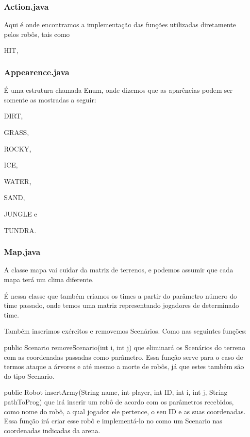 \documentclass[a4paper]{article}
\begin{document}
		\subsubsection{ Action.java }
		    Aqui é onde encontramos a implementação das funções
		    utilizadas diretamente pelos robôs, tais como 
		    {\textcolor{NavyBlue}{HIT},
		    {\textcolor{NavyBlue}{}
		    
		\subsubsection{ Appearence.java }
		    É uma estrutura chamada Enum, onde dizemos que as
		    aparências podem ser somente as mostradas a seguir:
		    {\textcolor{NavyBlue}{DIRT},
            {\textcolor{NavyBlue}{GRASS},
            {\textcolor{NavyBlue}{ROCKY},
            {\textcolor{NavyBlue}{ICE},
            {\textcolor{NavyBlue}{WATER},
            {\textcolor{NavyBlue}{SAND},
            {\textcolor{NavyBlue}{JUNGLE} e
            {\textcolor{NavyBlue}{TUNDRA}.
		
		\subsubsection{ Map.java }
		    A classe mapa vai cuidar da matriz de terrenos, e 
		    podemos assumir que cada mapa terá um clima diferente.
		    
		    É nessa classe que também criamos os times a partir
		    do parâmetro número do time passado, onde temos uma 
		    matriz representando jogadores de determinado time.
		    
		    Também inserimos exércitos e removemos Scenários.
		    Como nas seguintes funções:
		    
		    {\textcolor{NavyBlue}{public Scenario
		    removeScenario(int i, int j)}
		    que eliminará os Scenários do terreno com as coordenadas
		    passadas como parâmetro. Essa função serve para o caso 
		    de termos ataque a árvores e até mesmo a morte de robôs,
		    já que estes também são do tipo Scenario.
		    
		    {\textcolor{NavyBlue}{public Robot insertArmy(String
		    name, int player, int ID, int i, int j, String pathToProg)}
            que irá inserir um robô de acordo com os parâmetros
            recebidos, como nome do robô, a qual jogador ele pertence,
            o seu ID e as suas coordenadas.
            Essa função irá criar esse robô e implementá-lo no como 
            um Scenario nas coordenadas indicadas da arena.
		    
}}}}}}}}}}}}
\end{document}
